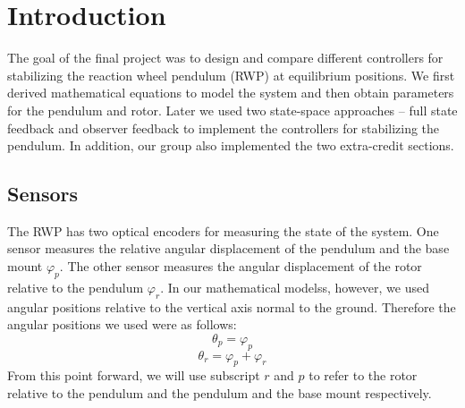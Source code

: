 




\section{Introduction}
The goal of the final project was to design and compare different controllers for stabilizing the reaction wheel pendulum (RWP) at equilibrium positions. We first derived mathematical equations to model the system and then obtain parameters for the pendulum and rotor. Later we used two state-space approaches -- full state feedback and observer feedback to implement the controllers for stabilizing the pendulum. In addition, our group also implemented the two extra-credit sections.
\subsection{Sensors}
The RWP has two optical encoders for measuring the state of the system. One sensor measures the relative angular displacement of the pendulum and the base mount $\varphi_p$. The other sensor measures the angular displacement of the rotor relative to the pendulum $\varphi_r$. In our mathematical modelss, however, we used angular positions relative to the vertical axis normal to the ground. Therefore the angular positions we used were as follows:
$$\theta_p = \varphi_p$$
$$\theta_r = \varphi_p+\varphi_r$$
From this point forward, we will use subscript $r$ and $p$ to refer to the rotor relative to the pendulum and the pendulum and the base mount respectively.
